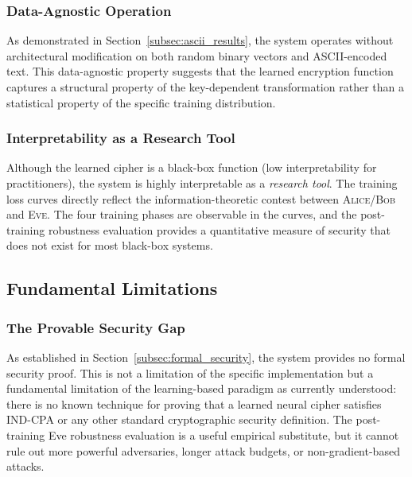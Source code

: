 \documentclass[12pt, a4paper]{article}
\newcommand{\alice}{\textsc{Alice}}
\newcommand{\bob}{\textsc{Bob}}
\newcommand{\eve}{\textsc{Eve}}
\begin{document}
\subsubsection*{Data-Agnostic Operation}

As demonstrated in Section~\ref{subsec:ascii_results}, the system operates without
architectural modification on both random binary vectors and
ASCII-encoded text. This data-agnostic property suggests that the learned
encryption function captures a structural property of the key-dependent
transformation rather than a statistical property of the specific
training distribution.

\subsubsection*{Interpretability as a Research Tool}

Although the learned cipher is a black-box function (low interpretability
for practitioners), the system is highly interpretable as a
\emph{research tool}. The training loss curves directly reflect the
information-theoretic contest between \alice{}/\bob{} and \eve{}.
The four training phases are observable in the curves, and the
post-training robustness evaluation provides a quantitative measure
of security that does not exist for most black-box systems.

\subsection{Fundamental Limitations}
\label{subsec:fundamental_limitations}

\subsubsection*{The Provable Security Gap}

As established in Section~\ref{subsec:formal_security}, the system provides no formal security
proof. This is not a limitation of the specific implementation but a
fundamental limitation of the learning-based paradigm as currently
understood: there is no known technique for proving that a learned
neural cipher satisfies IND-CPA or any other standard cryptographic
security definition. The post-training Eve robustness evaluation is a
useful empirical substitute, but it cannot rule out more powerful
adversaries, longer attack budgets, or non-gradient-based attacks.
\end{document}
